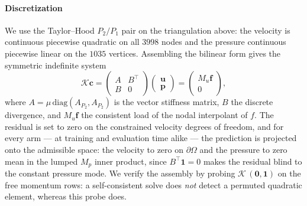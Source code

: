 \documentclass{article} %
\begin{document}
\paragraph{Discretization} We use the Taylor--Hood $P_2/P_1$ pair on the triangulation above: the velocity is continuous piecewise quadratic on all $3998$ nodes and the pressure continuous piecewise linear on the $1035$ vertices. Assembling the bilinear form gives the symmetric indefinite system
\begin{equation}\label{eq:appendix_stokes_system}
   \mathcal K \mathbf c = \begin{pmatrix} A & B^\top \\ B & 0 \end{pmatrix} \begin{pmatrix} \mathbf u \\ \mathbf p \end{pmatrix} = \begin{pmatrix} M_u \mathbf f \\ 0 \end{pmatrix},
\end{equation}
where $A = \mu\,\mathrm{diag}(A_{P_2}, A_{P_2})$ is the vector stiffness matrix, $B$ the discrete divergence, and $M_u \mathbf f$ the consistent load of the nodal interpolant of $f$. The residual is set to zero on the constrained velocity degrees of freedom, and for every arm --- at training and evaluation time alike --- the prediction is projected onto the admissible space: the velocity to zero on $\partial\Omega$ and the pressure to zero mean in the lumped $M_p$ inner product, since $B^\top \mathbf 1 = 0$ makes the residual blind to the constant pressure mode. We verify the assembly by probing $\mathcal K\,(\mathbf 0, \mathbf 1)$ on the free momentum rows: a self-consistent solve does \emph{not} detect a permuted quadratic element, whereas this probe does.
\end{document}
